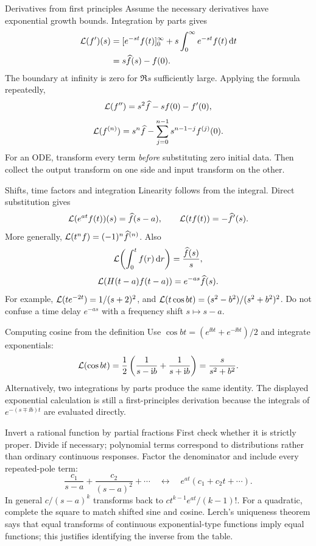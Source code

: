 \begin{method}{Derivatives from first principles}
Assume the necessary derivatives have exponential growth bounds. Integration by parts gives
\begin{align*}
\mathcal L(f')(s)&=[e^{-st}f(t)]_0^\infty+s\int_0^\infty e^{-st}f(t)\,\mathrm d t\\
&=s\widehat f(s)-f(0).
\end{align*}
The boundary at infinity is zero for $\Re s$ sufficiently large. Applying the formula repeatedly,
\[\mathcal L(f'')=s^2\widehat f-sf(0)-f'(0),\]
\[\mathcal L(f^{(n)})=s^n\widehat f-\sum_{j=0}^{n-1}s^{n-1-j}f^{(j)}(0).\]
For an ODE, transform every term \emph{before} substituting zero initial data. Then collect the output transform on one side and input transform on the other.
\end{method}
\begin{concept}{Shifts, time factors and integration}
Linearity follows from the integral. Direct substitution gives
\[\mathcal L(e^{at}f(t))(s)=\widehat f(s-a),\qquad\mathcal L(tf(t))=-\widehat f'(s).\]
More generally, $\mathcal L(t^nf)=(-1)^n\widehat f^{(n)}$. Also
\[\mathcal L\!\left(\int_0^t f(r)\,\mathrm d r\right)=\frac{\widehat f(s)}s,\]
\[\mathcal L(H(t-a)f(t-a))=e^{-as}\widehat f(s).\]
For example, $\mathcal L(te^{-2t})=1/(s+2)^2$, and $\mathcal L(t\cos bt)=(s^2-b^2)/(s^2+b^2)^2$. Do not confuse a time delay $e^{-as}$ with a frequency shift $s\mapsto s-a$.
\end{concept}
\begin{worked}{Computing cosine from the definition}
Use $\cos bt=(e^{\ii bt}+e^{-\ii bt})/2$ and integrate exponentials:
\[\mathcal L(\cos bt)=\frac12\left(\frac1{s-\mathrm i b}+\frac1{s+\mathrm i b}\right)=\frac{s}{s^2+b^2}.\]
Alternatively, two integrations by parts produce the same identity. The displayed exponential calculation is still a first-principles derivation because the integrals of $e^{-(s\mp\ii b)t}$ are evaluated directly.
\end{worked}
\begin{method}{Invert a rational function by partial fractions}
First check whether it is strictly proper. Divide if necessary; polynomial terms correspond to distributions rather than ordinary continuous responses. Factor the denominator and include every repeated-pole term:
\[\frac{c_1}{s-a}+\frac{c_2}{(s-a)^2}+\cdots\quad\longleftrightarrow\quad e^{at}\left(c_1+c_2t+\cdots\right).\]
In general $c/(s-a)^k$ transforms back to $ct^{k-1}e^{at}/(k-1)!$. For a quadratic, complete the square to match shifted sine and cosine. Lerch's uniqueness theorem says that equal transforms of continuous exponential-type functions imply equal functions; this justifies identifying the inverse from the table.
\end{method}
